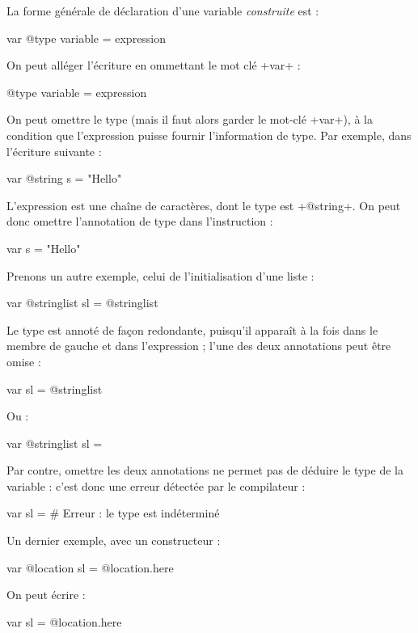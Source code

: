 La forme générale de déclaration d'une variable \emph{construite} est :
\begin{galgasbox}
var @type variable = expression
\end{galgasbox}

On peut alléger l'écriture en ommettant le mot clé \ggs+var+ :
\begin{galgasbox}
@type variable = expression
\end{galgasbox}

On peut omettre le type (mais il faut alors garder le mot-clé \ggs+var+), à la condition que l'expression puisse fournir l'information de type. Par exemple, dans l'écriture suivante :
\begin{galgas}
var @string s = "Hello"
\end{galgas}

L'expression est une chaîne de caractères, dont le type est \ggs+@string+. On peut donc omettre l'annotation de type dans l'instruction :
\begin{galgas}
var s = "Hello"
\end{galgas}


Prenons un autre exemple, celui de l'initialisation d'une liste :
\begin{galgas}
var @stringlist sl = @stringlist {}
\end{galgas}

Le type est annoté de façon redondante, puisqu'il apparaît à la fois dans le membre de gauche et dans l'expression ; l'une des deux annotations peut être omise :
\begin{galgas}
var sl = @stringlist {}
\end{galgas}

Ou :
\begin{galgas}
var @stringlist sl = {}
\end{galgas}

Par contre, omettre les deux annotations ne permet pas de déduire le type de la variable : c'est donc une erreur détectée par le compilateur :
\begin{galgas}
var sl = {} # Erreur : le type est indéterminé
\end{galgas}

Un dernier exemple, avec un constructeur :
\begin{galgas}
var @location sl = @location.here
\end{galgas}

On peut écrire :
\begin{galgas}
var sl = @location.here
\end{galgas}

